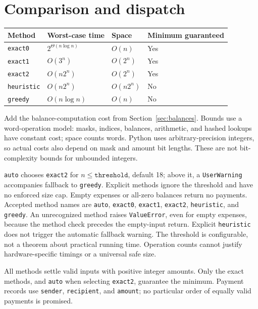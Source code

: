 \documentclass[11pt]{article}
\begin{document}
\section{Comparison and dispatch}\label{sec:comparison}
\begin{center}
\begin{tabular}{@{}llll@{}}
\toprule Method & Worst-case time & Space & Minimum guaranteed \\
\midrule
\texttt{exact0} & $2^{\Theta(n\log n)}$ & $O(n)$ & Yes \\
\texttt{exact1} & $O(3^n)$ & $O(2^n)$ & Yes \\
\texttt{exact2} & $O(n2^n)$ & $O(2^n)$ & Yes \\
\texttt{heuristic} & $O(n2^n)$ & $O(n2^n)$ & No \\
\texttt{greedy} & $O(n\log n)$ & $O(n)$ & No \\
\bottomrule
\end{tabular}
\end{center}
Add the balance-computation cost from Section~\ref{sec:balances}.
Bounds use a word-operation model: masks, indices, balances, arithmetic,
and hashed lookups have constant cost; space counts words. Python uses
arbitrary-precision integers, so actual costs also depend on mask and
amount bit lengths. These are not bit-complexity bounds for unbounded
integers.

\texttt{auto} chooses \texttt{exact2} for $n\leq\texttt{threshold}$,
default 18; above it, a \texttt{UserWarning} accompanies fallback to
\texttt{greedy}. Explicit methods ignore the threshold and have no
enforced size cap. Empty expenses or all-zero balances return no payments.
Accepted method names are \texttt{auto}, \texttt{exact0}, \texttt{exact1},
\texttt{exact2}, \texttt{heuristic}, and \texttt{greedy}. An unrecognized
method raises \texttt{ValueError}, even for empty expenses, because the
method check precedes the empty-input return. Explicit \texttt{heuristic}
does not trigger the automatic fallback warning.
The threshold is configurable, not a theorem about practical running time.
Operation counts cannot justify hardware-specific timings or a universal
safe size.

All methods settle valid inputs with positive integer amounts. Only the
exact methods, and \texttt{auto} when selecting \texttt{exact2}, guarantee
the minimum. Payment records use \texttt{sender}, \texttt{recipient}, and
\texttt{amount}; no particular order of equally valid payments is promised.
\end{document}
